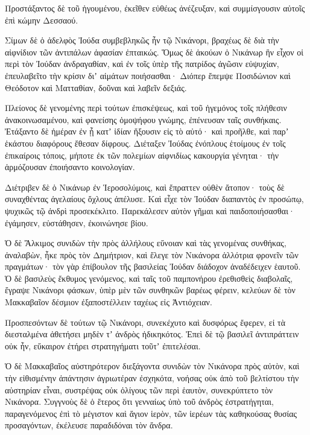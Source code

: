 {Προστάξαντος δὲ τοῦ ἡγουμένου, ἐκεῖθεν εὐθέως ἀνέζευξαν, καὶ συμμίσγουσιν αὐτοῖς ἐπὶ κώμην Δεσσαού.
\par }{\PP {}Σίμων δὲ ὁ ἀδελφὸς Ἰούδα συμβεβληκῶς ἦν τῷ Νικάνορι, βραχέως δὲ διὰ τὴν αἰφνίδιον τῶν ἀντιπάλων ἀφασίαν ἐπταικώς.
Ὅμως δὲ ἀκούων ὁ Νικάνωρ ἣν εἶχον οἱ περὶ τὸν Ἰούδαν ἀνδραγαθίαν, καὶ ἐν τοῖς ὑπὲρ τῆς πατρίδος ἀγῶσιν εὐψυχίαν, ἐπευλαβεῖτο τὴν κρίσιν διʼ αἱμάτων ποιήσασθαι·
Διόπερ ἔπεμψε Ποσιδώνιον καὶ Θεόδοτον καὶ Ματταθίαν, δοῦναι καὶ λαβεῖν δεξιάς.
\par }{\PP {}Πλείονος δὲ γενομένης περὶ τούτων ἐπισκέψεως, καὶ τοῦ ἡγεμόνος τοῖς πλήθεσιν ἀνακοινωσαμένου, καὶ φανείσης ὁμοψήφου γνώμης, ἐπένευσαν ταῖς συνθήκαις.
Ἐτάξαντο δὲ ἡμέραν ἐν ᾗ κατʼ ἰδίαν ἥξουσιν εἰς τὸ αὐτό· καὶ προῆλθε, καὶ παρʼ ἑκάστου διαφόρους ἔθεσαν δίφρους.
Διέταξεν Ἰούδας ἐνόπλους ἑτοίμους ἐν τοῖς ἐπικαίροις τόποις, μήποτε ἐκ τῶν πολεμίων αἰφνιδίως κακουργία γένηται· τὴν ἁρμόζουσαν ἐποιήσαντο κοινολογίαν.
\par }{\PP {}Διέτριβεν δὲ ὁ Νικάνωρ ἐν Ἱεροσολύμοις, καὶ ἔπραττεν οὐθὲν ἄτοπον· τοὺς δὲ συναχθέντας ἀγελαίους ὄχλους ἀπέλυσε.
Καὶ εἶχε τὸν Ἰούδαν διαπαντὸς ἐν προσώπῳ, ψυχικῶς τῷ ἀνδρὶ προσεκέκλιτο.
Παρεκάλεσεν αὐτὸν γῆμαι καὶ παιδοποιήσασθαι· ἐγάμησεν, εὐστάθησεν, ἐκοινώνησε βίου.
\par }{\PP {}Ὁ δὲ Ἄλκιμος συνιδὼν τὴν πρὸς ἀλλήλους εὔνοιαν καὶ τὰς γενομένας συνθήκας, ἀναλαβὼν, ἧκε πρὸς τὸν Δημήτριον, καὶ ἔλεγε τὸν Νικάνορα ἀλλότρια φρονεῖν τῶν πραγμάτων· τὸν γὰρ ἐπίβουλον τῆς βασιλείας Ἰούδαν διάδοχον ἀναδέδειχεν ἑαυτοῦ.
Ὁ δὲ βασιλεὺς ἔκθυμος γενόμενος, καὶ ταῖς τοῦ παμπονήρου ἐρεθισθεὶς διαβολαῖς, ἔγραψε Νικάνορι φάσκων, ὑπὲρ μὲν τῶν συνθηκῶν βαρέως φέρειν, κελεύων δὲ τὸν Μακκαβαῖον δέσμιον ἐξαποστέλλειν ταχέως εἰς Ἀντιόχειαν.
\par }{\PP {}Προσπεσόντων δὲ τούτων τῷ Νικάνορι, συνεκέχυτο καὶ δυσφόρως ἔφερεν, εἰ τὰ διεσταλμένα ἀθετήσει μηδὲν τʼ ἀνδρὸς ἠδικηκότος.
Ἐπεὶ δὲ τῷ βασιλεῖ ἀντιπράττειν οὐκ ἦν, εὔκαιρον ἐτήρει στρατηγήματι τοῦτʼ ἐπιτελέσαι.
\par }{\PP {}Ὁ δὲ Μακκαβαῖος αὐστηρότερον διεξάγοντα συνιδὼν τὸν Νικάνορα πρὸς αὐτὸν, καὶ τὴν εἰθισμένην ἀπάντησιν ἀγριωτέραν ἐσχηκότα, νοήσας οὐκ ἀπὸ τοῦ βελτίστου τὴν αὐστηρίαν εἶναι, συστρέψας οὐκ ὀλίγους τῶν περὶ ἑαυτὸν, συνεκρύπτετο τὸν Νικάνορα.
Συγγνοὺς δὲ ὁ ἕτερος ὅτι γενναίως ὑπὸ τοῦ ἀνδρὸς ἐστρατήγηται, παραγενόμενος ἐπὶ τὸ μέγιστον καὶ ἅγιον ἱερὸν, τῶν ἱερέων τὰς καθηκούσας θυσίας προσαγόντων, ἐκέλευσε παραδιδόναι τὸν ἄνδρα.
}
